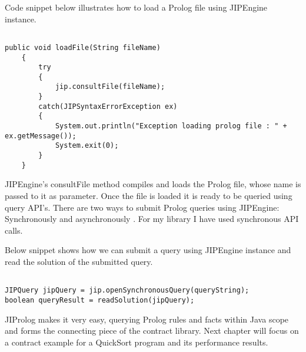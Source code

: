 \begin{minipage}{\linewidth}
Code snippet below illustrates how to load a Prolog file using JIPEngine instance.
\lstset{language=Java,caption=Loading a Prolog file using JIProlog API, captionpos=b, breaklines=true}       
\begin{lstlisting}[frame=single]

public void loadFile(String fileName)
	{
		try
		{
			jip.consultFile(fileName);
		}
		catch(JIPSyntaxErrorException ex)
		{
			System.out.println("Exception loading prolog file : " + ex.getMessage());
			System.exit(0);
		}
	}
\end{lstlisting}
\end{minipage}

JIPEngine's consultFile method compiles and loads the Prolog file, whose name is passed to it as parameter. Once the file is loaded it is ready to be queried using query API's. There are two ways to submit Prolog queries using JIPEngine: Synchronously and asynchronously \cite{JIProlog}. For my library I have used synchronous API calls. 

\begin{minipage}{\linewidth}
Below snippet shows how we can submit a query using JIPEngine instance and read the solution of the submitted query.

\lstset{language=Java,caption= Prolog Query Using JIProlog API, captionpos=b, breaklines=true}       
\begin{lstlisting}[frame=single]

JIPQuery jipQuery = jip.openSynchronousQuery(queryString);
boolean queryResult = readSolution(jipQuery);
\end{lstlisting}
\end{minipage}

JIProlog makes it very easy, querying Prolog rules and facts within Java scope and forms the connecting piece of the contract library. Next chapter will focus on a contract example for a QuickSort program and its performance results.

 